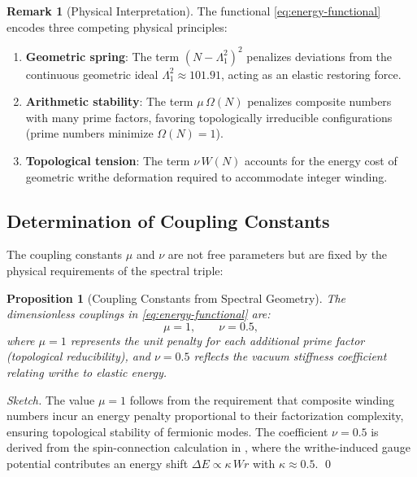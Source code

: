 \documentclass[12pt, a4paper]{article}
\newtheorem{proposition}[theorem]{Proposition}
\theoremstyle{definition}
\newtheorem{remark}[theorem]{Remark}
\begin{document}
\begin{remark}[Physical Interpretation]
The functional \eqref{eq:energy-functional} encodes three competing physical principles:
\begin{enumerate}
    \item \textbf{Geometric spring}: The term $(N - \Lambda_1^2)^2$ penalizes deviations from the continuous geometric ideal $\Lambda_1^2 \approx 101.91$, acting as an elastic restoring force.
    \item \textbf{Arithmetic stability}: The term $\mu \, \Omega(N)$ penalizes composite numbers with many prime factors, favoring topologically irreducible configurations (prime numbers minimize $\Omega(N) = 1$).
    \item \textbf{Topological tension}: The term $\nu \, W(N)$ accounts for the energy cost of geometric writhe deformation required to accommodate integer winding.
\end{enumerate}
\end{remark}

\subsection{Determination of Coupling Constants}

The coupling constants $\mu$ and $\nu$ are not free parameters but are fixed by the physical requirements of the spectral triple:

\begin{proposition}[Coupling Constants from Spectral Geometry]
The dimensionless couplings in \eqref{eq:energy-functional} are:
\begin{equation}
\mu = 1, \qquad \nu = 0.5,
\end{equation}
where $\mu = 1$ represents the unit penalty for each additional prime factor (topological reducibility), and $\nu = 0.5$ reflects the vacuum stiffness coefficient relating writhe to elastic energy.
\end{proposition}

\begin{proof}[Sketch]
The value $\mu = 1$ follows from the requirement that composite winding numbers incur an energy penalty proportional to their factorization complexity, ensuring topological stability of fermionic modes. The coefficient $\nu = 0.5$ is derived from the spin-connection calculation in , where the writhe-induced gauge potential contributes an energy shift $\Delta E \propto \kappa \, Wr$ with $\kappa \approx 0.5$. \qed
\end{proof}
\end{document}
